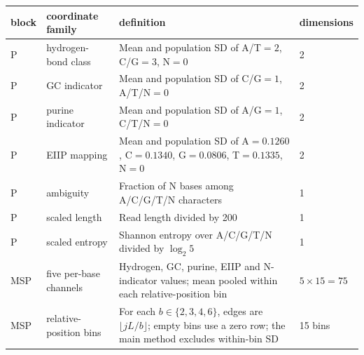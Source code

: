 \begin{tabular}{@{}p{}p{}p{}p{}@{}}
\toprule
\textbf{block} & \textbf{coordinate family} & \textbf{definition} & \textbf{dimensions} \\
\midrule
P & hydrogen-bond class & Mean and population SD of A/T$=2$, C/G$=3$, N$=0$ & 2 \\
P & GC indicator & Mean and population SD of C/G$=1$, A/T/N$=0$ & 2 \\
P & purine indicator & Mean and population SD of A/G$=1$, C/T/N$=0$ & 2 \\
P & EIIP mapping & Mean and population SD of A$=0.1260$, C$=0.1340$, G$=0.0806$, T$=0.1335$, N$=0$ & 2 \\
P & ambiguity & Fraction of N bases among A/C/G/T/N characters & 1 \\
P & scaled length & Read length divided by 200 & 1 \\
P & scaled entropy & Shannon entropy over A/C/G/T/N divided by $\log_2 5$ & 1 \\
\addlinespace
MSP & five per-base channels & Hydrogen, GC, purine, EIIP and N-indicator values; mean pooled within each relative-position bin & $5\times15=75$ \\
MSP & relative-position bins & For each $b\in\{2,3,4,6\}$, edges are $\lfloor jL/b\rfloor$; empty bins use a zero row; the main method excludes within-bin SD & 15 bins \\
\bottomrule
\end{tabular}
